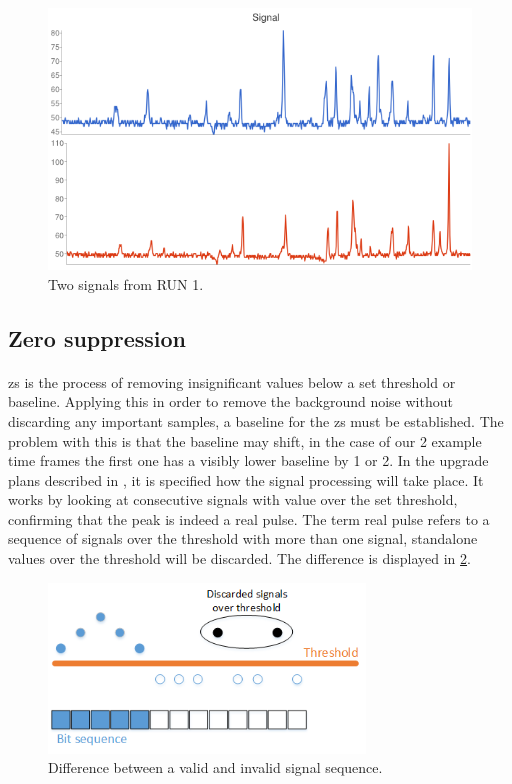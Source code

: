 \documentclass[a4paper, 12pt]{report}\dfrac{\right }{•}
\begin{document}
\begin{figure}[t]
	\centering
		\includegraphics[width=1.0\textwidth]{images/signal.png}
		\caption{Two signals from RUN 1.}
		\label{fig:signal}
\end{figure}

\subsection{Zero suppression} 
\label{subsec:zs}

\paragraph{}
\gls{zs} is the process of removing insignificant values below a set threshold or baseline\cite{zerosuppression}.
Applying this in order to remove the background noise without discarding any important samples, a baseline for the \gls{zs} must be established.
The problem with this is that the baseline may shift, in the case of our 2 example time frames the first one has a visibly lower baseline by 1 or 2.
In the upgrade plans described in \cite{tdr-015}, it is specified how the signal processing will take place.
It works by looking at consecutive signals with value over the set threshold, confirming that the peak is indeed a real pulse.
The term real pulse refers to a sequence of signals over the threshold with more than one signal, standalone values over the threshold will be discarded.
The difference is displayed in \ref{fig:minseq}.

\begin{figure}[h!]
	\centering
		\includegraphics[width=0.75\textwidth]{images/minseq.png}
		\caption{Difference between a valid and invalid signal sequence.}
		\label{fig:minseq}
\end{figure}
\end{document}
